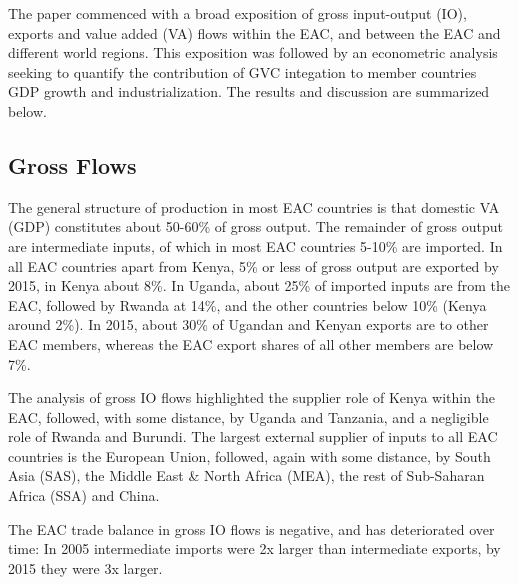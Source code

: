 \documentclass[a4paper]{article}
\begin{document}
The paper commenced with a broad exposition of gross input-output (IO), exports and value added (VA) flows within the EAC, and between the EAC and different world regions. This exposition was followed by an econometric analysis seeking to quantify the contribution of GVC integation to member countries GDP growth and industrialization. The results and discussion are summarized below. \newline

\subsection{Gross Flows}

The general structure of production in most EAC countries is that domestic VA (GDP) constitutes about 50-60\% of gross output. The remainder of gross output are intermediate inputs, of which in most EAC countries 5-10\% are imported. In all EAC countries apart from Kenya, 5\% or less of  gross output are exported by 2015, in Kenya about 8\%. In Uganda, about 25\% of imported inputs are from the EAC, followed by Rwanda at 14\%, and the other countries below 10\% (Kenya around 2\%). In 2015, about 30\% of Ugandan and Kenyan exports are to other EAC members, whereas the EAC export shares of all other members are below 7\%. \newline

The analysis of gross IO flows highlighted the supplier role of Kenya within the EAC, followed, with some distance, by Uganda and Tanzania, and a negligible role of Rwanda and Burundi. The largest external supplier of inputs to all EAC countries is the European Union, followed, again with some distance, by South Asia (SAS), the Middle East \& North Africa (MEA), the rest of Sub-Saharan Africa (SSA) and China. \newline

The EAC trade balance in gross IO flows is negative, and has deteriorated over time: In 2005 intermediate imports were 2x larger than intermediate exports, by 2015 they were 3x larger. \newline
\end{document}
